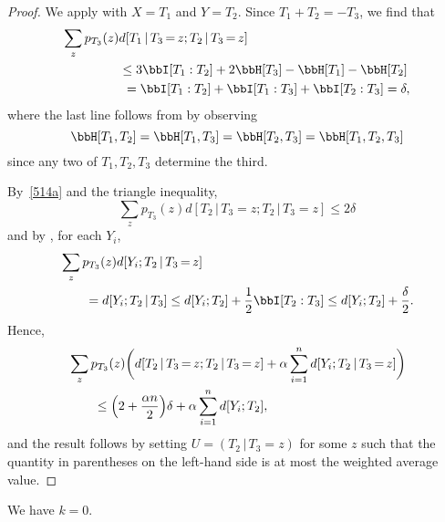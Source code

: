 \begin{proof}\leanok
  We apply  with $X=T_1$ and $Y=T_2$.
  Since $T_1+T_2=-T_3$, we find that
  \begin{equation}\label{514a}
  \begin{split}
    \sum_{z} p_{T_3}(z) & d[T_1 \,|\, T_3 \mathop{=} z;T_2 \,|\, T_3 \mathop{=} z] \\
    &\leq  3 \bbI[T_1 : T_2] + 2 \bbH[T_3] - \bbH[T_1] - \bbH[T_2] \\
    &\ = \bbI[T_1 : T_2] + \bbI[T_1 : T_3] + \bbI[T_2 : T_3]
    = \delta,
  \end{split}
\end{equation}
  where the last line follows from  by observing
  \[
    \bbH[T_1,T_2] = \bbH[T_1,T_3] = \bbH[T_2,T_3] = \bbH[T_1,T_2,T_3]
  \]
  since any two of $T_1,T_2,T_3$ determine the third.

  By~\eqref{514a} and the triangle inequality,
  \[
    \sum_z p_{T_3}(z) d[T_2 \,|\, T_3 \mathop{=} z; T_2 \,|\, T_3\mathop{=}z] \leq 2 \delta
  \]
  and by , for each $Y_i$,
  \begin{align*}
    &\sum_z p_{T_3}(z) d[Y_i; T_2 \,|\, T_3 \mathop{=} z] \\
    &\qquad= d[Y_i; T_2 \,|\, T_3]
                                    \leq d[Y_i;T_2] + \frac12 \bbI[T_2 : T_3]
                                    \leq d[Y_i;T_2] + \frac{\delta}{2}.
  \end{align*}
  Hence,
  \begin{align*}
    &\sum_z p_{T_3}(z) \bigg( d[T_2 \,|\, T_3 \mathop{=} z; T_2 \,|\, T_3 \mathop{=} z] + \alpha \sum_{i=1}^n d[Y_i;T_2 \,|\, T_3 \mathop{=} z] \bigg) \\
    &\qquad \leq
    \Bigl(2 + \frac{\alpha n}{2} \Bigr) \delta + \alpha \sum_{i=1}^n d[Y_i; T_2],
  \end{align*}
  and the result follows by setting $U=(T_2 \,|\, T_3 \mathop{=} z)$ for some $z$ such that the quantity in parentheses on the left-hand side is at most the weighted average value.
\end{proof}

\begin{proposition}\label{k-vanish}\leanok  We have $k = 0$.
\end{proposition}

